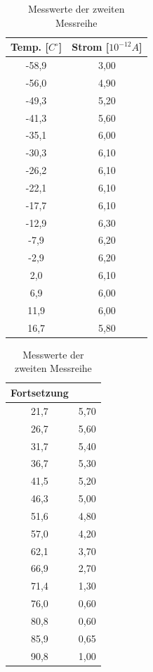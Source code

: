\begin{table}
\begin{minipage}{0.45\textwidth}
\begin{tabular}{c|c}
Temp. [$C^\circ$] & Strom [$10^{-12}A$]\\\hline
-58,9	&3,00\\\hline
-56,0	&4,90\\\hline
-49,3	&5,20\\\hline
-41,3	&5,60\\\hline
-35,1	&6,00\\\hline
-30,3	&6,10\\\hline
-26,2	&6,10\\\hline
-22,1	&6,10\\\hline
-17,7	&6,10\\\hline
-12,9	&6,30\\\hline
-7,9	&6,20\\\hline
-2,9	&6,20\\\hline
2,0		&6,10\\\hline
6,9		&6,00\\\hline
11,9	&6,00\\\hline
16,7	&5,80\\\hline
\end{tabular}
\end{minipage}
\begin{minipage}{0.45\textwidth}
\begin{tabular}{c|c}
Fortsetzung & \\\hline
21,7	&5,70\\\hline
26,7	&5,60\\\hline
31,7	&5,40\\\hline
36,7	&5,30\\\hline
41,5	&5,20\\\hline
46,3	&5,00\\\hline
51,6	&4,80\\\hline
57,0	&4,20\\\hline
62,1	&3,70\\\hline
66,9	&2,70\\\hline
71,4	&1,30\\\hline
76,0	&0,60\\\hline
80,8	&0,60\\\hline
85,9	&0,65\\\hline
90,8	&1,00\\\hline
\end{tabular}
\end{minipage}
\caption{Messwerte der zweiten Messreihe}
\label{tab_werte2}
\end{table}


